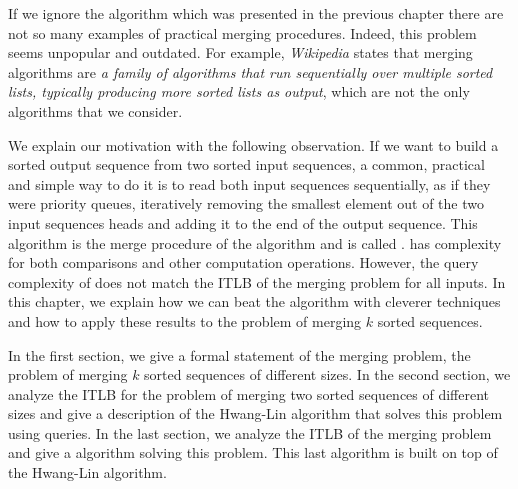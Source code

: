 \label{tree:merging:intro}

If we ignore the \mergesort algorithm which was presented in
the previous chapter there are not so many examples of practical merging
procedures. Indeed, this problem seems unpopular and outdated. For example,
\emph{Wikipedia} states that merging algorithms are \emph{a family of algorithms
that run sequentially over multiple sorted lists, typically producing more
sorted lists as output}, which are not the only algorithms that we
consider.

We explain our motivation with the following observation.
If we want to build a sorted output sequence from two sorted input sequences, a
common, practical and simple way to do it is to read both input sequences
sequentially, as if they were priority queues, iteratively removing the
smallest element out of the two input sequences heads and adding it to the end
of the output sequence. This algorithm is the merge procedure of the \mergesort
algorithm and is called \tapemerge. \tapemerge has  complexity for
both comparisons and other computation operations. However, the query
complexity of \tapemerge does not match the ITLB of the merging problem for all
inputs. In this chapter, we explain how we can beat the \tapemerge algorithm
with cleverer techniques and how to apply these results to the problem of
merging \(k\) sorted sequences.

In the first section, we give a formal statement of the merging problem, \ie
the problem of merging \(k\) sorted sequences of different sizes. In the second
section, we analyze the ITLB for the problem of merging two sorted sequences of
different sizes and give a description of the Hwang-Lin algorithm
\cite{DBLP:journals/siamcomp/HwangL72} that solves this problem using
 queries. In the last section, we analyze the ITLB of the merging
problem and give a  algorithm solving this problem. This last
algorithm is built on top of the Hwang-Lin algorithm.
